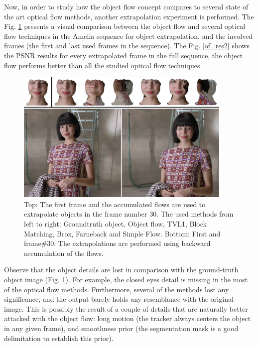 Now, in order to study how the object flow concept compares to several state of the art optical flow 
methods, another extrapolation experiment is performed. 
The Fig. \ref{compare2} presents a visual comparison between the object flow and several optical flow 
techniques in the Amelia sequence for object extrapolation, and the involved frames (the first and last used frames in the sequence). 
The Fig. \ref{of_res2} shows the PSNR results for every extrapolated frame in the full sequence, 
the object flow performs better than all the studied optical flow techniques.


   \begin{figure}[t]
      \centering
      \includegraphics[width=0.925\textwidth]{../images/compare2.png}
      \caption{Top: The first frame and the accumulated flows are used to extrapolate objects in the frame number 30. The used methods from left to right: Groundtruth object, Object flow, TVL1, Block Matching, Brox, Farneback and Simple Flow. 
		Bottom: First and frame\#30. The extrapolations are performed using backward accumulation of the flows.}
      \label{compare2}
   \end{figure}
	\setlength{\belowcaptionskip}{-10pt}


Observe that the object details are lost in comparison with the ground-truth object image (Fig. \ref{compare2}). For example, the closed eyes detail is missing in the most of the optical 
flow methods. Furthermore, several of the methods lost any significance, and the output barely holds any resemblance with the original image. This is possibly the result of a couple of details that are naturally better attacked with the object flow: 
long motion (the tracker always centers the object in any given frame), and smoothness prior (the segmentation mask is a 
good delimitation to establish this prior).

